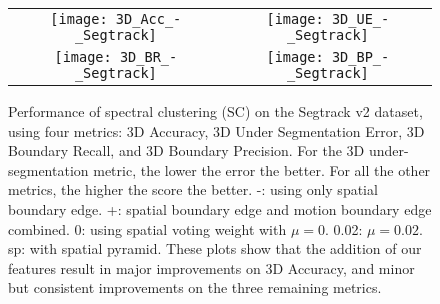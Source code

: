 \documentclass[runningheads]{llncs}
\begin{document}
\begin{figure}[]
\begin{center}
\begin{adjustbox}{max width=0.9\textwidth }
\begin{tabular}{cc}
\texttt{[image: 3D\_Acc\_-\_Segtrack]}&
\texttt{[image: 3D\_UE\_-\_Segtrack]}\\
\texttt{[image: 3D\_BR\_-\_Segtrack]}&
\texttt{[image: 3D\_BP\_-\_Segtrack]}\\
\end{tabular}
\end{adjustbox}
\end{center}
\caption{Performance of spectral clustering (SC) \cite{Galasso2013} on the Segtrack v2 dataset, using four metrics: 3D Accuracy, 3D Under Segmentation Error, 3D Boundary Recall, and 3D Boundary Precision. For the 3D under-segmentation metric, the lower the error the better. For all the other metrics, the higher the score the better. -: using only spatial boundary edge. +: spatial boundary edge and motion boundary edge combined. 0: using spatial voting weight with $\mu =0$. 0.02: $\mu =0.02$. sp: with spatial pyramid. These plots show that the addition of our features result in major improvements on 3D Accuracy, and minor but consistent improvements on the three remaining metrics.}
\label{VSS_seg}
\end{figure}
\end{document}
